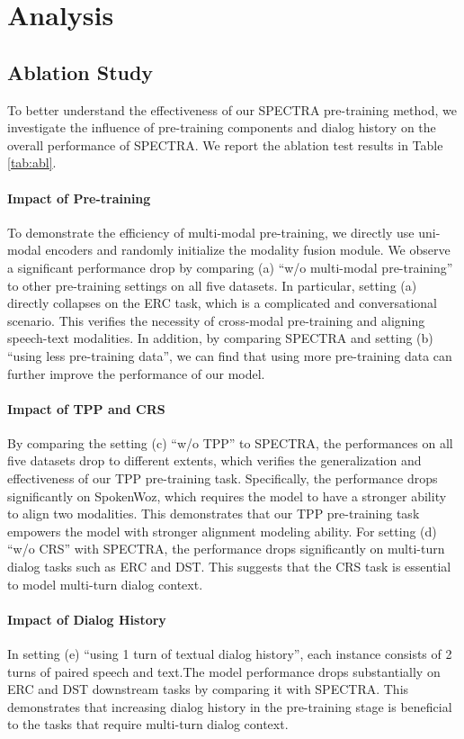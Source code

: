 \documentclass[11pt]{article}
\begin{document}
\section{Analysis}

\subsection{Ablation Study}

To better understand the effectiveness of our SPECTRA pre-training method, we investigate the influence of pre-training components and dialog history on the overall performance of SPECTRA.
We report the ablation test results in Table \ref{tab:abl}.

\paragraph{Impact of Pre-training}
To demonstrate the efficiency of multi-modal pre-training, we directly use uni-modal encoders and randomly initialize the modality fusion module. 
We observe a significant performance drop by comparing (a) ``w/o multi-modal pre-training'' to other pre-training settings on all five datasets. 
In particular, setting (a) directly collapses on the ERC task, which is a complicated and conversational scenario. 
This verifies the necessity of cross-modal pre-training and aligning speech-text modalities. 
In addition, by comparing SPECTRA and setting (b) ``using less pre-training data'', we can find that using more pre-training data can further improve the performance of our model.


\paragraph{Impact of TPP and CRS}
By comparing the setting (c) ``w/o TPP'' to SPECTRA, the performances on all five datasets drop to different extents, which verifies the generalization and  effectiveness of our TPP pre-training task. Specifically, the performance drops significantly on SpokenWoz, which requires the model to have a stronger ability to align two modalities. This demonstrates that our TPP pre-training task empowers the model with stronger alignment modeling ability.
For setting (d) ``w/o CRS'' with SPECTRA, the performance drops significantly on multi-turn dialog tasks such as ERC and DST. This suggests that the CRS task is essential to model multi-turn dialog context.

\paragraph{Impact of Dialog History}
In setting (e) ``using 1 turn of textual dialog history'', each instance consists of 2 turns of paired speech and text.The model performance drops substantially on ERC and DST downstream tasks by comparing it with SPECTRA. This demonstrates that increasing dialog history in the pre-training stage is beneficial to the tasks that require multi-turn dialog context.
\end{document}
